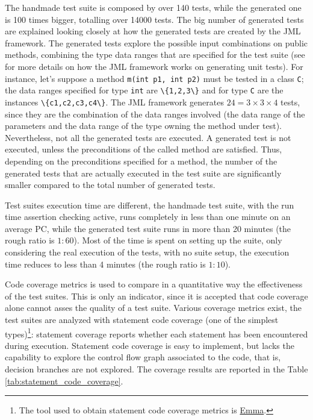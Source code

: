 \documentclass[english]{lni}
\newcommand{\myhref}[2]{\ifpdf\href{#1}{#2}\else\htmladdnormallinkfoot{#2}{#1}\fi}
\newcommand{\lil}[1]{\texttt{\lstinline|#1|}}
\begin{document}
The handmade test suite is composed by over 140 tests, while the generated one is 100 times bigger, totalling over 14000 tests.
The big number of generated tests are explained looking closely at how the generated tests are created by the JML framework. 
The generated tests explore the possible input combinations on public methods, combining the type data ranges that are specified for the test suite (see \cite{Cheon-Leavens02} for more details on how the JML framework works on generating unit tests). 
For instance, let's suppose a method \lil{m(int p1, int p2)} must be tested in a class \lil{C}; the data ranges specified for type \lil{int} are \lil{\{1,2,3\}} and for type \lil{C} are the instances \lil{\{c1,c2,c3,c4\}}. 
The JML framework generates $24 = 3 \times 3 \times 4$ tests, since they are the combination of the data ranges involved (the data range of the parameters and the data range of the type owning the method under test). 
Nevertheless, not all the generated tests are executed.
A generated test is not executed, unless the preconditions of the called method are satisfied. 
Thus, depending on the preconditions specified for a method, the number of the generated tests that are actually executed in the test suite are significantly smaller compared to the total number of generated tests.

Test suites execution time are different, the handmade test suite, with the run time assertion checking active, runs completely in less than one minute on an average PC, while the generated test suite runs in more than 20 minutes (the rough ratio is $ 1 : 60 $). 
Most of the time is spent on setting up the suite, only considering the real execution of the tests, with no suite setup, the execution time reduces to less than 4 minutes (the rough ratio is $ 1 : 10 $).

Code coverage metrics is used to compare in a quantitative way the effectiveness of the test suites. 
This is only an indicator, since it is accepted that code coverage alone cannot asses the quality of a test suite\cite{Marick1999,Chockler2006}.
Various coverage metrics exist, the test suites are analyzed with statement code coverage (one of the simplest types)\footnote{The tool used to obtain statement code coverage metrics is \myhref{http://emma.sourceforge.net/}{Emma}.}: statement coverage reports whether each statement has been encountered during execution. 
Statement code coverage is easy to implement, but lacks the capability to explore the control flow graph associated to the code, that is,
decision branches are not explored. 
The coverage results are reported in the Table \ref{tab:statement_code_coverage}.
\end{document}
